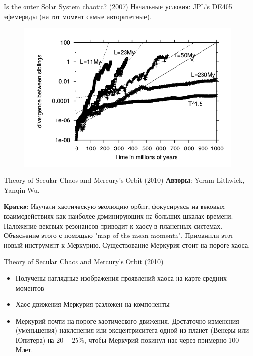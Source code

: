 \documentclass{beamer}
\begin{document}
\begin{frame}{Is the outer Solar System chaotic? (2007)}
        Начальные условия: JPL's DE405 эфемериды (на тот момент самые авторитетные).
\begin{figure}[h]
\begin{minipage}[h]{0.8\linewidth}
\includegraphics[width=1\linewidth]{./07_1.png}
\end{minipage}
\end{figure}
\end{frame}

\begin{frame}{Theory of Secular Chaos and Mercury's Orbit (2010)}
        \textbf{Авторы}: Yoram Lithwick, Yanqin Wu.

        \textbf{Кратко}: Изучали хаотическую эволюцию орбит, фокусируясь на вековых взаимодействиях как наиболее доминирующих на больших шкалах времени. Наложение вековых резонансов приводит к хаосу в планетных системах. Объяснение этого с помощью "map of the mean momenta". Применили этот новый инструмент к Меркурию. Существование Меркурия стоит на пороге хаоса.

\end{frame}

\begin{frame}{Theory of Secular Chaos and Mercury's Orbit (2010)}
        \begin{itemize}
                \item Получены наглядные изображения проявлений хаоса на карте средних моментов
                \item Хаос движения Меркурия разложен на компоненты
                \item Меркурий почти на пороге хаотического движения. Достаточно изменения (уменьшения) наклонения или эксцентриситета одной из планет (Венеры или Юпитера) на $20 - 25$\%, чтобы Меркурий покинул нас через примерно 100 Млет.
        \end{itemize}
\end{frame}
\end{document}
